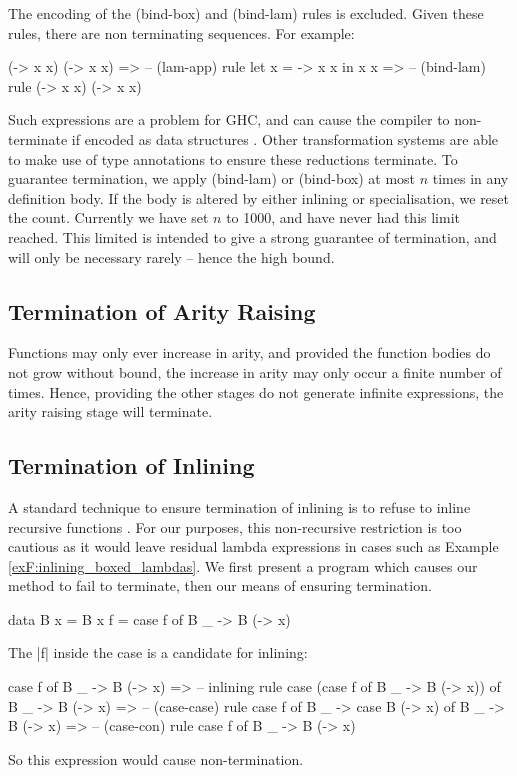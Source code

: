 The encoding of the (bind-box) and (bind-lam) rules is excluded. Given these rules, there are non terminating sequences. For example:

\ignore\begin{code}
(\x -> x x) (\x -> x x)
   => -- (lam-app) rule
let x = \x -> x x in x x
   => -- (bind-lam) rule
(\x -> x x) (\x -> x x)
\end{code}

Such expressions are a problem for GHC, and can cause the compiler to non-terminate if encoded as data structures \cite{spj:inlining}. Other transformation systems \cite{chin:higher_order_removal} are able to make use of type annotations to ensure these reductions terminate. To guarantee termination, we apply (bind-lam) or (bind-box) at most $n$ times in any definition body. If the body is altered by either inlining or specialisation, we reset the count. Currently we have set $n$ to 1000, and have never had this limit reached. This limited is intended to give a strong guarantee of termination, and will only be necessary rarely -- hence the high bound.

\subsection{Termination of Arity Raising}

Functions may only ever increase in arity, and provided the function bodies do not grow without bound, the increase in arity may only occur a finite number of times. Hence, providing the other stages do not generate infinite expressions, the arity raising stage will terminate.

\subsection{Termination of Inlining}

A standard technique to ensure termination of inlining is to refuse to inline recursive functions \cite{spj:inlining}. For our purposes, this non-recursive restriction is too cautious as it would leave residual lambda expressions in cases such as Example \ref{exF:inlining_boxed_lambdas}. We first present a program which causes our method to fail to terminate, then our means of ensuring termination.

\begin{example}
\begin{code}
data B x = B x
f = case  f of
          B _ -> B (\x -> x)
\end{code}

The |f| inside the case is a candidate for inlining:

\ignore\begin{code}
case f of B _ -> B (\x -> x)
    => -- inlining rule
case (case f of B _ -> B (\x -> x)) of B _ -> B (\x -> x)
    => -- (case-case) rule
case f of B _ -> case B (\x -> x) of B _ -> B (\x -> x)
    => -- (case-con) rule
case f of B _ -> B (\x -> x)
\end{code}

\noindent So this expression would cause non-termination.
\end{example}


